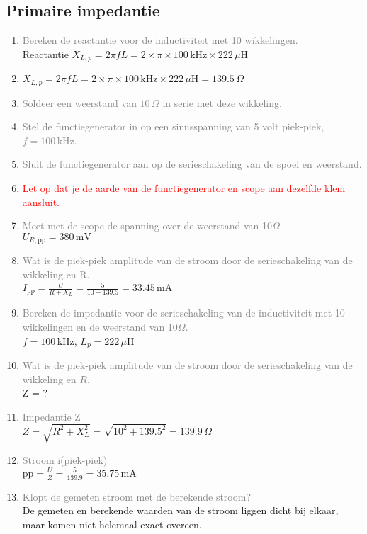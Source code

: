 \subsection{Primaire impedantie}
\begin{enumerate}
    \item \textcolor{gray}{Bereken de reactantie voor de inductiviteit met 10 wikkelingen.}
    \\ Reactantie \( X_{L,p} = 2 \pi f L = 2 \times \pi \times 100 \, \text{kHz} \times 222 \, \mu \text{H} \)
    \item\( X_{L,p} = 2 \pi f L = 2 \times \pi \times 100 \, \text{kHz} \times 222 \, \mu \text{H} = 139.5 \, \Omega \)
    \item \textcolor{gray}{Soldeer een weerstand van \(10 \, \Omega\) in serie met deze wikkeling.}
    \item \textcolor{gray}{Stel de functiegenerator in op een sinusspanning van 5 volt piek-piek, \( f = 100 \, \text{kHz} \).}
    \item \textcolor{gray}{Sluit de functiegenerator aan op de serieschakeling van de spoel en weerstand.}
    \item \textcolor{red}{Let op dat je de aarde van de functiegenerator en scope aan dezelfde klem aansluit.}
    \item \textcolor{gray}{Meet met de scope de spanning over de weerstand van 10\(\Omega\).}
    \\ \( U_{R,\text{pp}} = 380 \, \text{mV} \)
    \item \textcolor{gray}{Wat is de piek-piek amplitude van de stroom door de serieschakeling van de wikkeling en R.}
    \\ \(I_{\text{pp}} = \frac{U}{R + X_{L}} = \frac{5}{10 + 139.5} = 33.45 \, \text{mA}\)
    \item \textcolor{gray}{Bereken de impedantie voor de serieschakeling van de inductiviteit met 10 wikkelingen en de weerstand van 10\(\Omega\).}
    \\ \( f = 100 \, \text{kHz} \), \( L_p = 222 \, \mu \text{H} \)
    \item \textcolor{gray}{Wat is de piek-piek amplitude van de stroom door de serieschakeling van de wikkeling en \( R \).}
    \\ Z = ?
    \item \textcolor{gray}{Impedantie Z}
    \\ \(Z = \sqrt{R^2 + X_{L}^2} = \sqrt{10^2 + 139.5^2} = 139.9 \, \Omega\)
    \item \textcolor{gray}{Stroom i(piek-piek)}
    \\ \(\text{pp} = \frac{U}{Z} = \frac{5}{139.9} = 35.75 \, \text{mA}\)
    \item \textcolor{gray}{Klopt de gemeten stroom met de berekende stroom?}
    \\ De gemeten en berekende waarden van de stroom liggen dicht bij elkaar, maar komen niet helemaal exact overeen.
\end{enumerate}